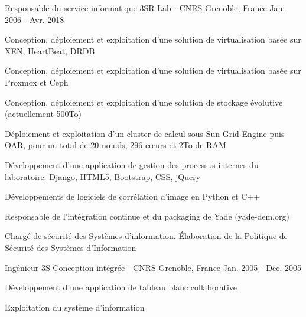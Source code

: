 \begin{cventries}
  \cventry
    {Responsable du service informatique} %
    {3SR Lab - CNRS} %
    {Grenoble, France} %
    {Jan. 2006 - Avr. 2018} %
    {
      \begin{cvitems} %
        \item {Conception, déploiement et exploitation d'une solution de virtualisation basée sur XEN, HeartBeat, DRDB}
        \item {Conception, déploiement et exploitation d'une solution de virtualisation basée sur Proxmox et Ceph}
        \item {Conception, déploiement et exploitation d'une solution de stockage évolutive (actuellement 500To)}
        \item {Déploiement et exploitation d'un cluster de calcul sous Sun Grid Engine puis OAR, pour un total de 20 nœuds, 296 cœurs et 2To de RAM}
        \item {Développement d'une application de gestion des processus internes du laboratoire. Django, HTML5, Bootstrap, CSS, jQuery}
        \item {Développements de logiciels de corrélation d'image en Python et C++}
        \item {Responsable de l'intégration continue et du packaging de Yade (yade-dem.org)}
        \item {Chargé de sécurité des Systèmes d'information. Élaboration de la Politique de Sécurité des Systèmes d'Information}
      \end{cvitems}
    }

  \cventry
    {Ingénieur} %
    {3S Conception intégrée - CNRS} %
    {Grenoble, France} %
    {Jan. 2005 - Dec. 2005} %
    {
      \begin{cvitems} %
        \item {Développement d'une application de tableau blanc collaborative}
        \item {Exploitation du système d'information}
      \end{cvitems}
    }

\end{cventries}
